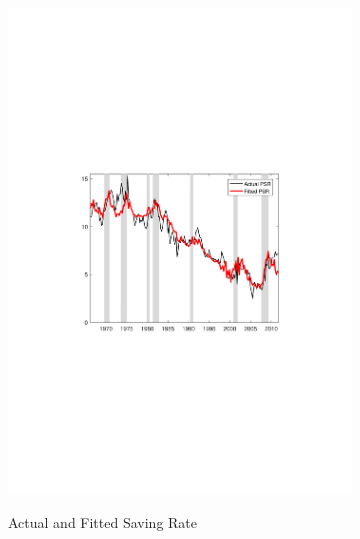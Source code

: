 \documentclass[titlepage]{\econtex}
\begin{document}
\begin{figure}	\caption{The Structural Estimation: Main Results} \label{fig:structuralE}
	\centering
	\begin{subfigure}[t]{0.49\textheight}
		\centering
		{\includegraphics[width=0.475\textheight]{./Figures/fPSR_StructFit}}
		\caption{Actual and Fitted Saving Rate}		\label{fPSR_StructFit}
	\end{subfigure}
	\begin{subfigure}[t]{0.49\textheight}
		\centering

\end{subfigure}
\end{figure}
\end{document}
